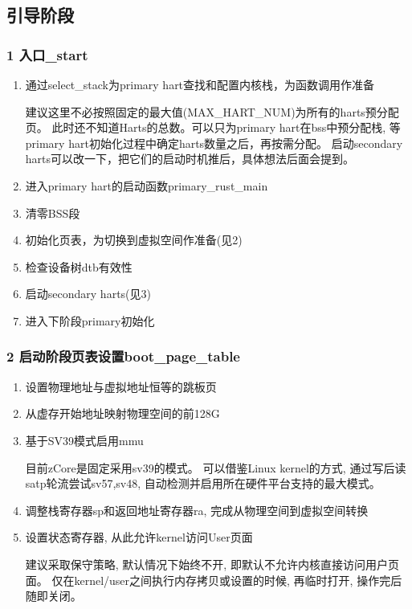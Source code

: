 \documentclass[
8pt, %
]{beamer}
\begin{document}
	\subsection{引导阶段}

	\begin{frame}
		\frametitle{1 入口\_start}
		\begin{enumerate}
			\item 通过select\_stack为primary hart查找和配置内核栈，为函数调用作准备
			\begin{block}{}
			建议这里不必按照固定的最大值(MAX\_HART\_NUM)为所有的harts预分配页。
            此时还不知道Harts的总数。可以只为primary hart在bss中预分配栈,
            等primary hart初始化过程中确定harts数量之后，再按需分配。
            启动secondary harts可以改一下，把它们的启动时机推后，具体想法后面会提到。
			\end{block}
			\item 进入primary hart的启动函数primary\_rust\_main
			\item 清零BSS段
			\item 初始化页表，为切换到虚拟空间作准备(见2)
			\item 检查设备树dtb有效性
			\item 启动secondary harts(见3)
			\item 进入下阶段primary初始化
		\end{enumerate}
	\end{frame}

	\begin{frame}
		\frametitle{2 启动阶段页表设置boot\_page\_table}
		\begin{enumerate}
			\item 设置物理地址与虚拟地址恒等的跳板页
			\item 从虚存开始地址映射物理空间的前128G
			\item 基于SV39模式启用mmu
			\begin{block}{}
				目前zCore是固定采用sv39的模式。
                可以借鉴Linux kernel的方式, 通过写后读satp轮流尝试sv57,sv48,
                自动检测并启用所在硬件平台支持的最大模式。
			\end{block}
			\item 调整栈寄存器sp和返回地址寄存器ra, 完成从物理空间到虚拟空间转换
			\item 设置状态寄存器, 从此允许kernel访问User页面
			\begin{block}{}
				建议采取保守策略, 默认情况下始终不开, 即默认不允许内核直接访问用户页面。
                仅在kernel/user之间执行内存拷贝或设置的时候, 再临时打开, 操作完后随即关闭。
			\end{block}
		\end{enumerate}
	\end{frame}
\end{document}
